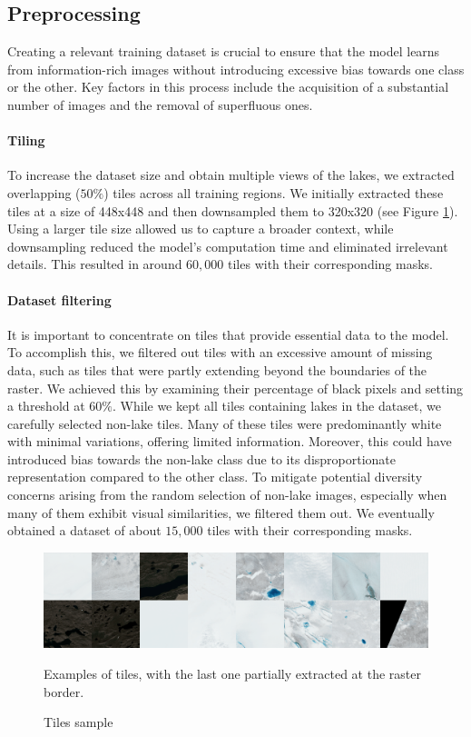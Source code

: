 \documentclass[sigconf]{acmart}
\begin{document}
\subsection{Preprocessing}
Creating a relevant training dataset is crucial to ensure that the model learns from information-rich images without introducing excessive bias towards one class or the other. Key factors in this process include the acquisition of a substantial number of images and the removal of superfluous ones.

\paragraph{Tiling} To increase the dataset size and obtain multiple views of the lakes, we extracted overlapping ($50\%$) tiles across all training regions. We initially extracted these tiles at a size of 448x448 and then downsampled them to 320x320 (see Figure \ref{fig:figure1}). Using a larger tile size allowed us to capture a broader context, while downsampling reduced the model's computation time and eliminated irrelevant details. This resulted in around $60,000$ tiles with their corresponding masks.

\paragraph{Dataset filtering} It is important to concentrate on tiles that provide essential data to the model. To accomplish this, we filtered out tiles with an excessive amount of missing data, such as tiles that were partly extending beyond the boundaries of the raster. We achieved this by examining their percentage of black pixels and setting a threshold at $60\%$.
While we kept all tiles containing lakes in the dataset, we carefully selected non-lake tiles. Many of these tiles were predominantly white with minimal variations, offering limited information. Moreover, this could have introduced bias towards the non-lake class due to its disproportionate representation compared to the other class. 
To mitigate potential diversity concerns arising from the random selection of non-lake images, especially when many of them exhibit visual similarities, we filtered them out. We eventually obtained a dataset of about $15,000$ tiles with their corresponding masks.

\begin{figure}[t!]
\includegraphics[width=\columnwidth]{images/batch_sample.png}
\caption{Tiles sample}
\small Examples of tiles, with the last one partially extracted at the raster border.
\label{fig:figure1}
\end{figure}
\end{document}
